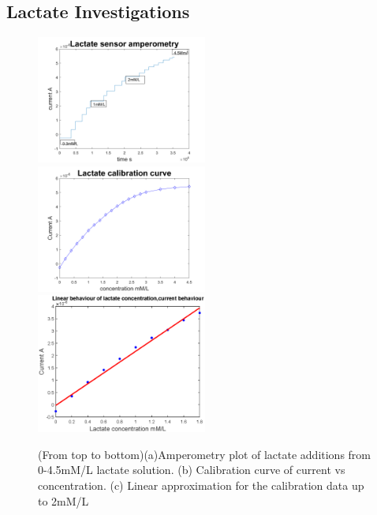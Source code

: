 \subsection{Lactate Investigations}
\begin{figure}[H]
    \centering
    \includegraphics[width=0.5\textwidth]{img/lactate_1.png}
    \includegraphics[width=0.5\textwidth]{img/lactate_2.png}
    \includegraphics[width=0.5\textwidth]{img/lactate_3.eps}
    \caption{(From top to bottom)(a)Amperometry plot of lactate additions from 0-4.5mM/L lactate solution. (b) Calibration curve of current vs concentration. (c) Linear approximation for the calibration data up to 2mM/L}
    \label{fig:lactate_result}
\end{figure}
